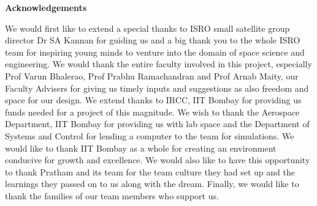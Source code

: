 \documentclass[../../main.tex]{subfiles}
\begin{document}
\newpage
\thispagestyle{plain}
\begin{center}
    \Large{\textbf{Acknowledgements}} 
\end{center}

We would first like to extend a special thanks to ISRO small satellite group director Dr SA Kannan for guiding us and a big thank you to the whole ISRO team for inspiring young minds to venture into the domain of space science and engineering. We would thank the entire faculty involved in this project, especially Prof Varun Bhalerao, Prof Prabhu Ramachandran and Prof Arnab Maity, our Faculty Advisers for giving us timely inputs and suggestions as also freedom and space for our design.
We extend thanks to IRCC, IIT Bombay for providing us funds needed for a project of this magnitude.
We wish to thank the Aerospace Department, IIT Bombay for providing us with lab space and the Department of Systems and Control for lending a computer to the team for simulations.
We would like to thank IIT Bombay as a whole for creating an environment conducive for growth and excellence.
We would also like to have this opportunity to thank Pratham and its team for the team culture they had set up and the learnings they passed on to us along with the dream. Finally, we would like to thank the families of our team members who support us.
\end{document}
